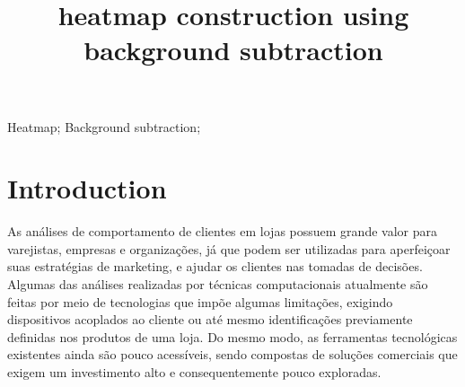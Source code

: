 \documentclass[10pt, conference]{IEEEtran}
\begin{document}
\title{heatmap construction using background subtraction}

\newif\iffinal
\finaltrue
\newcommand{\jemsid}{99999}
\iffinal
	\author{%
	    \and
	}
\else
  \author{Sibgrapi paper ID: \jemsid \\ }
\fi

\maketitle

\begin{abstract}
\end{abstract}

\begin{IEEEkeywords}
Heatmap; Background subtraction;

\end{IEEEkeywords}

\IEEEpeerreviewmaketitle

\section{Introduction}
As análises de comportamento de clientes em lojas possuem grande valor para varejistas, empresas e organizações, já que podem ser utilizadas para aperfeiçoar suas estratégias de marketing, e ajudar os clientes nas tomadas de decisões. Algumas das análises realizadas por técnicas computacionais atualmente são feitas por meio de tecnologias que impõe algumas limitações, exigindo dispositivos acoplados ao cliente ou até mesmo identificações previamente definidas nos produtos de uma loja. Do mesmo modo, as ferramentas tecnológicas existentes ainda são pouco acessíveis, sendo compostas de soluções comerciais que exigem um investimento alto e consequentemente pouco exploradas.
\end{document}

